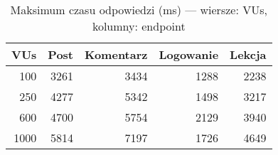 \begin{table}[H]
\centering
\caption{Maksimum czasu odpowiedzi (ms) — wiersze: VUs, kolumny: endpoint}
\label{tab:max-vs-vus}
\begin{tabular}{rrrrr}
\toprule
 VUs &  Post &  Komentarz &  Logowanie &  Lekcja \\
\midrule
 100 &  3261 &       3434 &       1288 &    2238 \\
 250 &  4277 &       5342 &       1498 &    3217 \\
 600 &  4700 &       5754 &       2129 &    3940 \\
1000 &  5814 &       7197 &       1726 &    4649 \\
\bottomrule
\end{tabular}
\end{table}
